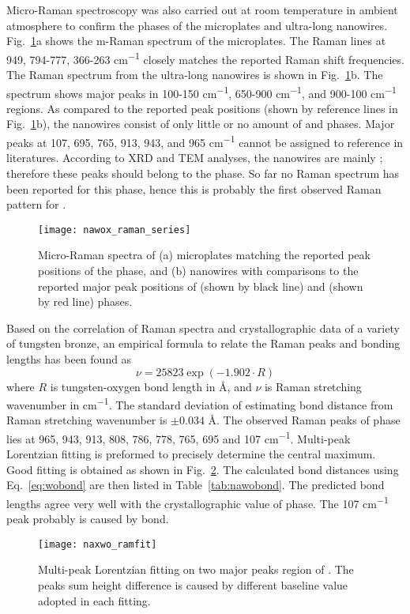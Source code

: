 Micro-Raman spectroscopy was also carried out at room temperature in ambient atmosphere to confirm the phases of the microplates and ultra-long nanowires. Fig.~\ref{fig:nawoxram}a shows the m-Raman spectrum of the microplates. The Raman lines at 949, 794-777, 366-263 \si{cm^{-1}} closely matches the reported  Raman shift frequencies.\cite{Fomichev1992} The Raman spectrum from the ultra-long nanowires is shown in Fig.~\ref{fig:nawoxram}b. The spectrum shows major peaks in 100-150 \si{cm^{-1}}, 650-900 \si{cm^{-1}}, and 900-100 \si{cm^{-1}} regions. As compared to the reported peak positions (shown by reference lines in Fig.~\ref{fig:nawoxram}b), the nanowires consist of only little or no amount of  and  phases. Major peaks at 107, 695, 765, 913, 943, and 965 \si{cm^{-1}} cannot be assigned to reference in literatures. According to XRD and TEM analyses, the nanowires are mainly ; therefore these peaks should belong to the  phase. So far no Raman spectrum has been reported for this phase, hence this is probably the first observed Raman pattern for .
\begin{figure}[htb]
\centering
\texttt{[image: nawox\_raman\_series]}
\caption[Raman spectra on ]{Micro-Raman spectra of (a) microplates matching the reported peak positions of the  phase, and (b) nanowires with comparisons to the reported major peak positions of  (shown by black line) and  (shown by red line) phases.}
\label{fig:nawoxram}
\end{figure}
Based on the correlation of Raman spectra and crystallographic data of a variety of tungsten bronze, an empirical formula to relate the Raman peaks and  bonding lengths has been found as
\begin{equation}\label{eq:wobond}
\nu = 25823 \exp(-1.902\cdot R)
\end{equation}
where $R$ is tungsten-oxygen bond length in \si{\angstrom}, and $\nu$ is Raman stretching wavenumber in \si{cm^{-1}}.\cite{Hardcastle1995} The standard deviation of estimating  bond distance from Raman stretching wavenumber is $\pm0.034$ \si{\angstrom}. The observed Raman peaks of  phase lies at 965, 943, 913, 808, 786, 778, 765, 695 and 107 \si{cm^{-1}}. Multi-peak Lorentzian fitting is preformed to precisely determine the central maximum. Good fitting is obtained as shown in Fig.~\ref{fig:naworamfit}. The calculated  bond distances using Eq.~\ref{eq:wobond} are then listed in Table~\ref{tab:nawobond}. The predicted  bond lengths agree very well with the crystallographic value of  phase.\cite{Triantafyllou1999a} The 107 \si{cm^{-1}} peak probably is caused by  bond.
\begin{figure}[htb]
\centering
\texttt{[image: naxwo\_ramfit]}
\caption[ Raman fitting]{Multi-peak Lorentzian fitting on two major peaks region of . The peaks sum height difference is caused by different baseline value adopted in each fitting.}
\label{fig:naworamfit}
\end{figure}

